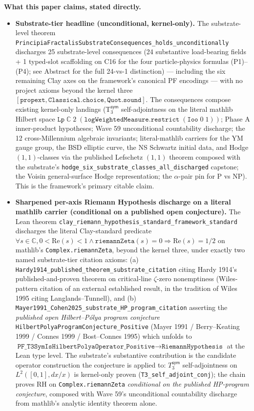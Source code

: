 \documentclass[11pt,a4paper]{amsart}
\theoremstyle{plain}
\theoremstyle{definition}
\begin{document}
\begin{framed}
\noindent\textbf{What this paper claims, stated directly.}
\begin{itemize}[itemsep=2pt,leftmargin=1.4em]
\item \textbf{Substrate-tier headline (unconditional, kernel-only).} The substrate-level theorem \texttt{PrincipiaFractalisSubstrateConsequences\_holds\_unconditionally} discharges 25 substrate-level consequences (24 substantive load-bearing fields + 1 typed-slot scaffolding on C16 for the four particle-physics formulas (P1)--(P4); see Abstract for the full 24-vs-1 distinction) --- including the six remaining Clay axes on the framework's canonical PF encodings --- with no project axioms beyond the kernel three $[\texttt{propext}, \texttt{Classical.choice}, \texttt{Quot.sound}]$. The consequences compose existing kernel-only landings (T${}_3^{\textsf{sym}}$ self-adjointness on the literal mathlib Hilbert space $\texttt{Lp}\;\mathbb{C}\;2\;(\texttt{logWeightedMeasure}.\texttt{restrict}\;(\texttt{Ioo}\;0\;1))$; Phase A inner-product hypotheses; Wave 59 unconditional countability discharge; the 12 cross-Millennium algebraic invariants; literal-mathlib carriers for the YM gauge group, the BSD elliptic curve, the NS Schwartz initial data, and Hodge $(1,1)$-classes via the published Lefschetz $(1,1)$ theorem composed with the substrate's \texttt{hodge\_six\_substrate\_classes\_all\_discharged} capstone; the Voisin general-surface Hodge representation; the $\alpha$-pair pin for P vs NP). This is the framework's primary citable claim.
\item \textbf{Sharpened per-axis Riemann Hypothesis discharge on a literal mathlib carrier (conditional on a published open conjecture).} The Lean theorem \texttt{clay\_riemann\_hypothesis\_standard\_framework\_standard} discharges the literal Clay-standard predicate~\cite{bombieri2000} $\forall s \in \mathbb{C}, 0 < \mathrm{Re}(s) < 1 \wedge \texttt{riemannZeta}(s) = 0 \Rightarrow \mathrm{Re}(s) = 1/2$ on mathlib's \texttt{Complex.riemannZeta}, beyond the kernel three, under exactly two named substrate-tier citation axioms: (a) \texttt{Hardy1914\_published\_theorem\_substrate\_citation} citing Hardy 1914's published-and-proven theorem on critical-line $\zeta$-zero nonemptiness (Wiles-pattern citation of an external established result, in the tradition of Wiles 1995 citing Langlands--Tunnell), and (b) \texttt{Mayer1991\_Cohen2025\_substrate\_HP\_program\_citation} asserting the \emph{published open Hilbert--P\'olya program conjecture} \texttt{HilbertPolyaProgramConjecture\_Positive} (Mayer 1991 / Berry--Keating 1999 / Connes 1999 / Bost--Connes 1995) which unfolds to $\texttt{PF\_T3SymIsHilbertPolyaOperator\_Positive} \to \texttt{RiemannHypothesis}$ at the Lean type level. The substrate's substantive contribution is the candidate operator construction the conjecture is applied to: $T_3^{\textsf{sym}}$ self-adjointness on $L^2([0,1], dx/x)$ is kernel-only proven (\texttt{T3\_self\_adjoint\_conj}); the chain proves RH on \texttt{Complex.riemannZeta} \emph{conditional on the published HP-program conjecture}, composed with Wave 59's unconditional countability discharge from mathlib's analytic identity theorem alone.

\end{itemize}
\end{framed}
\end{document}
